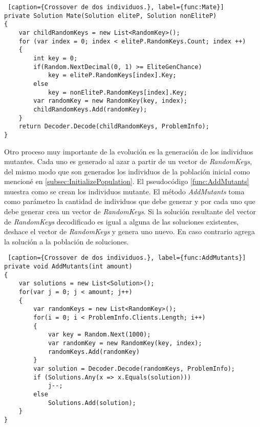\bigskip

\begin{minipage}{\textwidth}
\begin{lstlisting} [caption={Crossover de dos individuos.}, label={func:Mate}]
private Solution Mate(Solution eliteP, Solution nonEliteP)
{
	var childRandomKeys = new List<RandomKey>();
	for (var index = 0; index < eliteP.RandomKeys.Count; index ++)
	{
		int key = 0;
		if(Random.NextDecimal(0, 1) >= EliteGenChance)
			key = eliteP.RandomKeys[index].Key;
		else
			key = nonEliteP.RandomKeys[index].Key;
		var randomKey = new RandomKey(key, index);
		childRandomKeys.Add(randomKey);
	}
	return Decoder.Decode(childRandomKeys, ProblemInfo);
}
\end{lstlisting}
\end{minipage}

\bigskip

Otro proceso muy importante de la evolución es la generación de los individuos mutantes. Cada uno es generado al azar a partir de un vector de \textit{RandomKeys}, del mismo modo que son generados los individuos de la población inicial como mencioné en \ref{subsec:InitializePopulation}. El pseudocódigo \ref{func:AddMutants} muestra como se crean los individuos mutante. El método \textit{AddMutants} toma como parámetro la cantidad de individuos que debe generar y por cada uno que debe generar crea un vector de \textit{RandomKeys}. Si la solución resultante del vector de \textit{RandomKeys} decodificado es igual a alguna de las soluciones existentes, deshace el vector de \textit{RandomKeys} y genera uno nuevo. En caso contrario agrega la solución a la población de soluciones.

\bigskip

\begin{minipage}{\textwidth}
\begin{lstlisting} [caption={Crossover de dos individuos.}, label={func:AddMutants}]
private void AddMutants(int amount)
{
	var solutions = new List<Solution>();
	for(var j = 0; j < amount; j++)
	{
		var randomKeys = new List<RandomKey>();
		for(i = 0; i < ProblemInfo.Clients.Length; i++)
		{
			var key = Random.Next(1000);
			var randomKey = new RandomKey(key, index);
			randomKeys.Add(randomKey)
		}		
		var solution = Decoder.Decode(randomKeys, ProblemInfo);
		if (Solutions.Any(x => x.Equals(solution)))
			j--;
		else
			Solutions.Add(solution);
	}	
}
\end{lstlisting}
\end{minipage}

